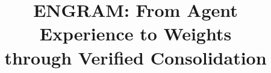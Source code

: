 \documentclass{article}
\title{ENGRAM: From Agent Experience to Weights\\through Verified Consolidation}
\date{}
\begin{document}
\maketitle







% 
\label{main-text-end}



\clearpage
\appendix

\setcounter{topnumber}{2}






\clearpage

\clearpage

\end{document}

